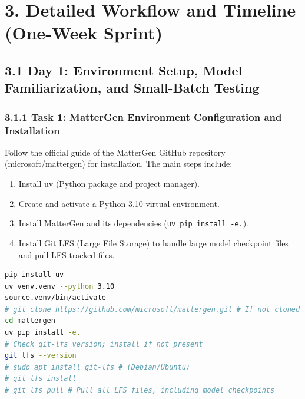 \documentclass[letterpaper]{article} %
\begin{document}
\section{3. Detailed Workflow and Timeline (One-Week Sprint)}

\subsection{3.1 Day 1: Environment Setup, Model Familiarization, and Small-Batch Testing}

\subsubsection{3.1.1 Task 1: MatterGen Environment Configuration and Installation}

Follow the official guide of the MatterGen GitHub repository (microsoft/mattergen) for installation. The main steps include:
\begin{enumerate}
    \item Install uv (Python package and project manager).
    \item Create and activate a Python 3.10 virtual environment.
    \item Install MatterGen and its dependencies (\texttt{uv pip install -e.}).
    \item Install Git LFS (Large File Storage) to handle large model checkpoint files and pull LFS-tracked files.
\end{enumerate}

\begin{lstlisting}[language=bash, caption={Example Commands (Linux, CUDA GPU)}]
pip install uv
uv venv.venv --python 3.10
source.venv/bin/activate
# git clone https://github.com/microsoft/mattergen.git # If not cloned yet
cd mattergen
uv pip install -e.
# Check git-lfs version; install if not present
git lfs --version
# sudo apt install git-lfs # (Debian/Ubuntu)
# git lfs install
# git lfs pull # Pull all LFS files, including model checkpoints
\end{lstlisting}
\end{document}
